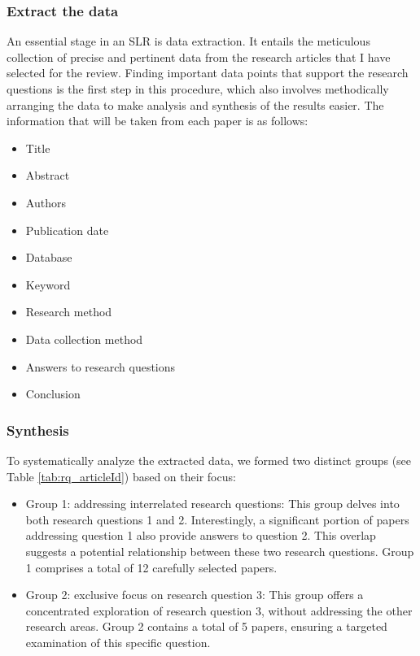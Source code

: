 \subsubsection{Extract the data}
An essential stage in an SLR is data extraction. It entails the meticulous collection of precise and pertinent data from the research articles that I have selected for the review. Finding important data points that support the research questions is the first step in this procedure, which also involves methodically arranging the data to make analysis and synthesis of the results easier.
The information that will be taken from each paper is as follows:
\begin{itemize}
    \item Title
    \item Abstract
    \item Authors
    \item Publication date
    \item Database
    \item Keyword
    \item Research method
    \item Data collection method
    \item Answers to research questions
    \item Conclusion
\end{itemize}

\subsubsection{Synthesis}

To systematically analyze the extracted data, we formed two distinct groups (see Table \ref{tab:rq_articleId}) based on their focus:

\begin{itemize}
    \item Group 1: addressing interrelated research questions: This group delves into both research questions 1 and 2. Interestingly, a significant portion of papers addressing question 1 also provide answers to question 2. This overlap suggests a potential relationship between these two research questions. Group 1 comprises a total of 12 carefully selected papers.
    \item Group 2: exclusive focus on research question 3: This group offers a concentrated exploration of research question 3, without addressing the other research areas. Group 2 contains a total of 5 papers, ensuring a targeted examination of this specific question.
\end{itemize}


